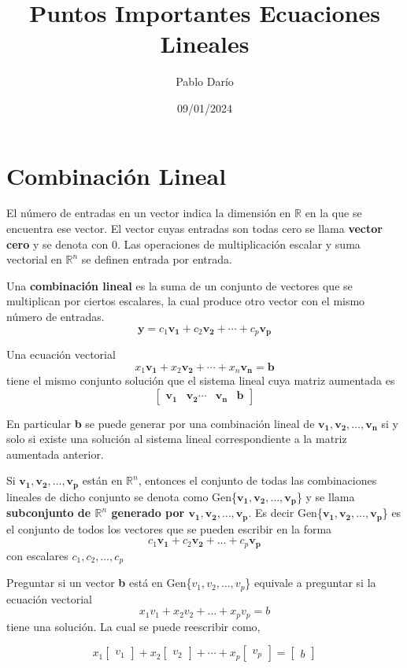\documentclass{article}
\title{Puntos Importantes Ecuaciones Lineales}
\author{Pablo Darío}
\date{09/01/2024}
\begin{document}
\maketitle
\section{Combinación Lineal}

El número de entradas en un vector indica la dimensión en $\mathbb{R}$ en la que se encuentra ese vector. El vector cuyas entradas son todas cero se llama \textbf{vector cero} y se denota con 0. Las operaciones de multiplicación escalar y suma vectorial en $\mathbb{R}^n$ se definen entrada por entrada.

Una \textbf{combinación lineal} es la suma de un conjunto de vectores que se multiplican por ciertos escalares, la cual produce otro vector con el mismo número de entradas. $$\mathbf{y} = c_1\mathbf{v_1} + c_2\mathbf{v_2} + \dotsb + c_p\mathbf{v_p}$$

Una ecuación vectorial $$x_1\mathbf{v_1} + x_2\mathbf{v_2} + \dotsb + x_n\mathbf{v_n} = \mathbf{b}$$ tiene el mismo conjunto solución que el sistema lineal cuya matriz aumentada es $$\begin{bmatrix} \mathbf{v_1} & \mathbf{v_2} \dotsb & \mathbf{v_n} & \mathbf{b} \end{bmatrix}$$

En particular \textbf{b} se puede generar por una combinación lineal de $\mathbf{v_1}, \mathbf{v_2},\dots, \mathbf{v_n}$ si y solo si existe una solución al sistema lineal correspondiente a la matriz aumentada anterior.

Si $\mathbf{v_1},\mathbf{v_2},\dots, \mathbf{v_p}$ están en $\mathbb{R}^n$, entonces el conjunto de todas las combinaciones lineales de dicho conjunto se denota como Gen\{$\mathbf{v_1},\mathbf{v_2},\dots, \mathbf{v_p}$\} y se llama \textbf{subconjunto de $\mathbb{R}^n$ generado por $\mathbf{v_1},\mathbf{v_2},\dots, \mathbf{v_p}$}. Es decir Gen\{$\mathbf{v_1},\mathbf{v_2},\dots, \mathbf{v_p}$\} es el conjunto de todos los vectores que se pueden escribir en la forma $$c_1\mathbf{v_1} + c_2\mathbf{v_2} + \dots + c_p\mathbf{v_p}$$ con escalares $c_1,c_2,\dots, c_p$

Preguntar si un vector \textbf{b} está en Gen\{$v_1,v_2,\dots, v_p$\} equivale a preguntar si la ecuación vectorial $$x_1v_1 + x_2v_2 + \dots + x_pv_p = b$$ tiene una solución. La cual se puede reescribir como, 

\begin{equation*}
    x_1 \begin{bmatrix} v_1 \end{bmatrix} 
    +x_2 \begin{bmatrix} v_2 \end{bmatrix}
    + \dotsb + x_p \begin{bmatrix} v_p \end{bmatrix}
    = \begin{bmatrix} b \end{bmatrix}
\end{equation*}
\end{document}
